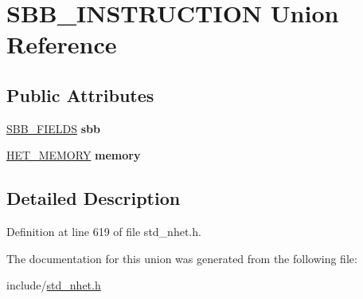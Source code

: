 \hypertarget{unionSBB__INSTRUCTION}{}\section{S\+B\+B\+\_\+\+I\+N\+S\+T\+R\+U\+C\+T\+I\+ON Union Reference}
\label{unionSBB__INSTRUCTION}
\subsection*{Public Attributes}
\begin{DoxyCompactItemize}
\item 
\mbox{\label{unionSBB__INSTRUCTION_af57d2f4f99938716305ae7c792f27df9}} 
\mbox{\hyperlink{structSBB__format}{S\+B\+B\+\_\+\+F\+I\+E\+L\+DS}} {\bfseries sbb}
\item 
\mbox{\label{unionSBB__INSTRUCTION_ae708f957d02b1bd8f12e2637d3628d82}} 
\mbox{\hyperlink{structmemory__format}{H\+E\+T\+\_\+\+M\+E\+M\+O\+RY}} {\bfseries memory}
\end{DoxyCompactItemize}


\subsection{Detailed Description}


Definition at line 619 of file std\+\_\+nhet.\+h.



The documentation for this union was generated from the following file\+:\begin{DoxyCompactItemize}
\item 
include/\mbox{\hyperlink{std__nhet_8h}{std\+\_\+nhet.\+h}}\end{DoxyCompactItemize}

